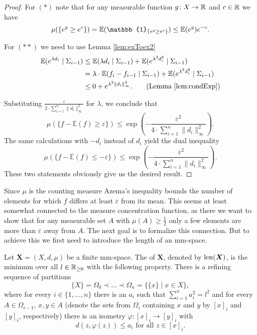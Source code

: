 \begin{proof}
	For $(\ast)$ note that for any measurable function $g\colon X\to\mathbb{R}$ and $c\in\mathbb{R}$ we have %
	\[\mu(\{e^g\geq e^c\})=\E(\mathbb{1}_{\{e^g\geq e^c\}})\leq\E(e^g)e^{-c}.\]
				
	For $(\ast\ast)$ we need to use Lemma \ref{lem:exToex2}
	\begin{align*}
		\E(e^{\lambda d_i}\mid \Sigma_{i-1}) & \leq \E(\lambda d_i\mid\Sigma_{i-1})+\E(e^{\lambda^2 d^2_i}\mid\Sigma_{i-1})            \\
		                                     & =\lambda\cdot\E( f_i-f_{i-1}\mid\Sigma_{i-1}) + \E(e^{\lambda^2 d^2_i}\mid\Sigma_{i-1}) \\
		                                     & \leq 0 + e^{\lambda^2 \|d_i\|_\infty^2}.\tag{Lemma \ref{lem:condExp}}                   
	\end{align*}
				
	Substituting $\frac{\varepsilon}{2\cdot\sum_{i=1}^{n}\|d_i\|_\infty^2}$ for $\lambda$, we conclude that
	\[\mu(\{f-\mathbb{E}(f)\geq \varepsilon\})\leq\exp\left(-\frac{\varepsilon^2}{4\cdot\sum_{i=1}^{n}\|d_i\|^2_\infty}\right). \]
	The same calculations with $-d_i$ instead of $d_i$ yield the dual inequality
	\[\mu(\{f-\mathbb{E}(f)\leq -\varepsilon\})\leq\exp\left(-\frac{\varepsilon^2}{4\cdot\sum_{i=1}^{n}\|d_i\|^2_\infty}\right). \]
	These two statements obviously give us the desired result.
\end{proof}
		
Since $\mu$ is the counting measure Azema's inequality bounds the number of elements for which $f$ differs at least $\varepsilon$ from its mean. This seems at least somewhat connected to the measure concentration function, as there we want to show that for any measurable set $A$ with $\mu(A)\geq\frac{1}{2}$ only a few elements are more than $\varepsilon$ away from $A$.
The next goal is to formalize this connection. %
But to achieve this we first need to introduce the length of an mm-space.
\begin{definition}\label{def:length}
	Let $\boldsymbol{X}=(X,d,\mu)$ be a finite mm-space. The  of $\boldsymbol X$, denoted by $\operatorname{len}(\boldsymbol{X})$, is the minimum over all $l\in\mathbb{R}_{\geq0}$ with the following property. There is a refining sequence of partitions 
	\[\{X\}=\Omega_0\prec\dots\prec\Omega_n=\{\{x\}\mid x\in X\},\]
	where for every $i\in\{1,\dots,n\}$ there is an $a_i$ such that $\sum_{i=1}^{n}a^2_i=l^2$ and for every $A\in \Omega_{i-1}$, $x,y\in A$ (denote the sets from $\Omega_i$ containing $x$ and $y$ by $[x]_i$ and $[y]_i$, respectively) there is an isometry $\varphi\colon[x]_i\to [y]_i$ with 
	\[d(z,\varphi(z))\leq a_i\text{ for all $z\in[x]_i$.}\]
\end{definition}

